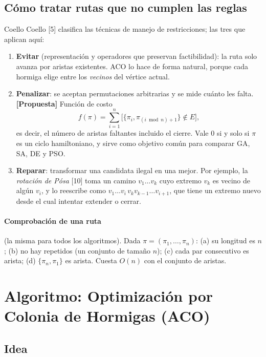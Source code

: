 \documentclass[11pt,letterpaper]{article}
\theoremstyle{definition}
\newcommand{\prop}{\textcolor{green!40!black}{\textbf{[Propuesta]}}}
\begin{document}
\subsection{Cómo tratar rutas que no cumplen las reglas}

Coello Coello [5] clasifica las técnicas de manejo de restricciones; las tres que aplican aquí:

\begin{enumerate}
  \item \textbf{Evitar} (representación y operadores que preservan factibilidad): la ruta
        solo avanza por aristas existentes. ACO lo hace de forma natural, porque cada
        hormiga elige entre los \emph{vecinos} del vértice actual.
  \item \textbf{Penalizar}: se aceptan permutaciones arbitrarias y se mide cuánto les falta.
        \prop{} Función de costo
        \[
          f(\pi)=\sum_{i=1}^{n}\bigl[\{\pi_i,\pi_{(i \bmod n)+1}\}\notin E\bigr],
        \]
        es decir, el número de aristas faltantes incluido el cierre. Vale $0$ si y solo si
        $\pi$ es un ciclo hamiltoniano, y sirve como objetivo común para comparar GA, SA, DE
        y PSO.
  \item \textbf{Reparar}: transformar una candidata ilegal en una mejor. Por ejemplo, la
        \emph{rotación de Pósa} [10] toma un camino $v_1\dots v_k$ cuyo extremo $v_k$ es vecino
        de algún $v_i$, y lo reescribe como $v_1\dots v_i\,v_k v_{k-1}\dots v_{i+1}$, que tiene
        un extremo nuevo desde el cual intentar extender o cerrar.
\end{enumerate}

\paragraph{Comprobación de una ruta} (la misma para todos los algoritmos). Dada
$\pi=(\pi_1,\dots,\pi_n)$: (a) su longitud es $n$; (b) no hay repetidos (un conjunto de
tamaño $n$); (c) cada par consecutivo es arista; (d) $\{\pi_n,\pi_1\}$ es arista. Cuesta
$O(n)$ con el conjunto de aristas.

\section{Algoritmo: Optimización por Colonia de Hormigas (ACO)}

\subsection{Idea}
\end{document}
